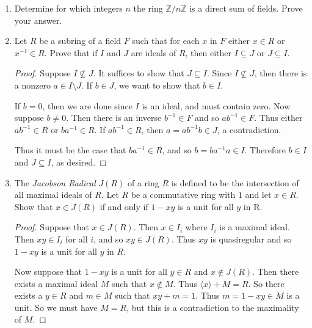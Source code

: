 \documentclass{article}
\theoremstyle{definition}
\begin{document}
\begin{enumerate}
\begin{proof}
                    Now again by the surjectivity of $\phi$, we must have some $r\in R$ such that $\phi(r)=rx=1$. Thus $x$ is a unit and since the choice of $x$ was arbitrary (except for the restriction of $x$ being nonzero), we conclude that $R$ must be a field.
                \end{proof}

            \item Determine for which integers $n$ the ring $\mathbb{Z}/n\mathbb{Z}$ is a direct sum of fields. Prove your answer.
            
            \item Let $R$ be a subring of a field $F$ such that for each $x$ in $F$ either $x\in R$ or $x^{-1}\in R$. Prove that if $I$ and $J$ are ideals of $R$, then either $I\subseteq J$ or $J\subseteq I$.
            
            \begin{proof}
                Suppose $I\nsubseteq J$. It suffices to show that $J\subseteq I$. Since $I \nsubseteq J$, then there is a nonzero $a\in I\setminus J$. If $b\in J$, we want to show that $b\in I$. 

                If $b=0$, then we are done since $I$ is an ideal, and must contain zero. Now suppose $b\neq 0$. Then there is an inverse $b^{-1}\in F$ and so $ab^{-1}\in F$. Thus either $ab^{-1}\in R$ or $ba^{-1}\in R$. If $ab^{-1}\in R$, then $a=ab^{-1}b\in J$, a contradiction. 
                
                Thus it must be the case that $ba^{-1}\in R$, and so $b=ba^{-1}a\in I$. Therefore $b\in I$ and $J\subseteq I$, as desired. 
            \end{proof}

            \item The \textit{Jacobson Radical} $J(R)$ of a ring $R$ is defined to be the intersection of all maximal ideals of $R$. Let $R$ be a commutative ring with $1$ and let $x\in R$. Show that $x\in J(R)$ if and only if $1-xy$ is a unit for all $y$ in R.
            
            \begin{proof}
                Suppose that $x\in J(R)$. Then $x\in I_i$ where $I_i$ is a maximal ideal. Then $xy\in I_i$ for all $i$, and so $xy\in J(R)$. Thus $xy$ is quasiregular and so $1-xy$ is a unit for all $y$ in $R$.

                Now suppose that $1-xy$ is a unit for all $y\in R$ and $x\notin J(R)$. Then there exists a maximal ideal $M$ such that $x\notin M$. Thus $\langle x \rangle +M=R$. So there exists a $y\in R$ and $m\in M$ such that $xy+m=1$. Thus $m=1-xy\in M$ is a unit. So we must have $M=R$, but this is a contradiction to the maximality of $M$.
            \end{proof}


\end{enumerate}
\end{document}
